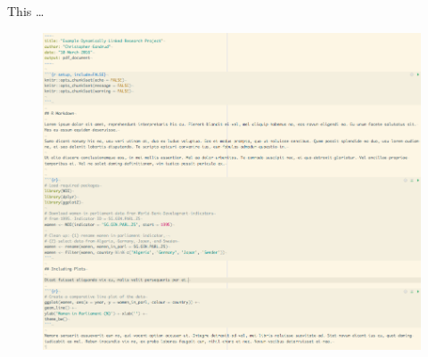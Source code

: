 \documentclass[10pt]{beamer}
\begin{document}
\begin{frame}{This \ldots}

    \begin{figure}
            \includegraphics[scale=0.3]{img/rmarkdown_source.png}
    \end{figure}

\end{frame}
\end{document}
